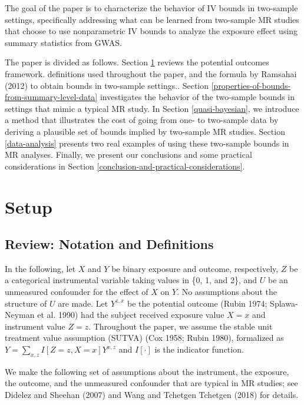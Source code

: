 \documentclass[
]{article}
\theoremstyle{plain}
\begin{document}
The goal of the paper is to characterize the behavior of IV bounds in two-sample settings, specifically addressing what can be learned from two-sample MR studies that choose to use nonparametric IV bounds to analyze the exposure effect using summary statistics from GWAS.

The paper is divided as follows. Section \ref{setup} reviews the potential outcomes framework. definitions used throughout the paper, and the formula by Ramsahai (2012) to obtain bounds in two-sample settings.. Section \ref{properties-of-bounds-from-summary-level-data} investigates the behavior of the two-sample bounds in settings that mimic a typical MR study. In Section \ref{quasi-bayesian}, we introduce a method that illustrates the cost of going from one- to two-sample data by deriving a plausible set of bounds implied by two-sample MR studies. Section \ref{data-analysis} presents two real examples of using these two-sample bounds in MR analyses. Finally, we present our conclusions and some practical considerations in Section \ref{conclusion-and-practical-considerations}.

\hypertarget{setup}{%
\section{Setup}\label{setup}}

\hypertarget{review-notation-and-definitions}{%
\subsection{Review: Notation and Definitions}\label{review-notation-and-definitions}}

\label{notation-and-definitions}

In the following, let \(X\) and \(Y\) be binary exposure and outcome, respectively, \(Z\) be a categorical instrumental variable taking values in \{0, 1, and 2\}, and \(U\) be an unmeasured confounder for the effect of \(X\) on \(Y\). No assumptions about the structure of \(U\) are made. Let \(Y^{z,x}\) be the potential outcome (Rubin 1974; Splawa-Neyman et al. 1990) had the subject received exposure value \(X = x\) and instrument value \(Z = z\). Throughout the paper, we assume the stable unit treatment value assumption (SUTVA) (Cox 1958; Rubin 1980), formalized as \(Y = \sum_{x,z} I[Z = z, X = x] Y^{x,z}\) and \(I[\cdot]\) is the indicator function.

We make the following set of assumptions about the instrument, the exposure, the outcome, and the unmeasured confounder that are typical in MR studies; see Didelez and Sheehan (2007) and Wang and Tchetgen Tchetgen (2018) for details.
\end{document}
